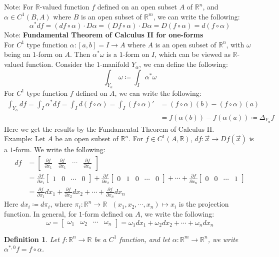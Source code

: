 \documentclass[15pt]{book}
\theoremstyle{break}
\theoremstyle{break}
\newtheorem{defn}{Definition}[corL]
\newcommand{\R}{\mathbb{R}}
\newcommand{\bmat}[1]{\begin{bmatrix} #1 \end{bmatrix}}
\newcommand{\note}{\color{red}Note: \color{black}}
\newcommand{\example}{\color{green}Example: \color{black}}
\begin{document}
\note For $\R$-valued function $f$ defined on an open subset $A$ of $\R^n$, and $\alpha\in C^1(B,A)$ where $B$ is an open subset of $\R^m$, we can write the following: 
$$\alpha^*df = (df\circ \alpha)\cdot D\alpha =(Df\circ \alpha)\cdot D\alpha = D(f\circ \alpha) = d(f\circ \alpha)$$ 
\note \textbf{Fundamental Theorem of Calculus II for one-forms}\\
For $C^1$ type function $\alpha:[a,b]=I \to A$ where $A$ is an open subset of $\R^n$, with $\omega$ being an $1$-form on $A$. Then $\alpha^*\omega$ is a $1$-form on $I$, which can be viewed as $\R$-valued function. Consider the $1$-manifold $Y_\alpha$, we can define the following:
$$\int_{Y_\alpha} \omega \coloneqq \int_I \alpha^*\omega$$
For $C^1$ type function $f$ defined on $A$, we can write the following: 
\begin{align*}
\int_{Y_\alpha} df = \int_I \alpha^*df = \int_I d(f\circ \alpha) = \int_I (f\circ \alpha)' 
&= (f\circ \alpha)(b) - (f\circ \alpha) (a) \\
&= f(\alpha(b)) - f(\alpha(a))\coloneqq \Delta_{Y_\alpha}f
\end{align*}
Here we get the results by the Fundamental Theorem of Calculus II. \\


\example Let $A$ be an open subset of $\R^n$. For $f\in C^1(A,\R)$, $df:\vec{x} \to Df(\vec{x})$ is a $1$-form. We write the following:
\begin{align*}
df &= \bmat{\frac{\partial f}{\partial x_1}&\frac{\partial f}{\partial x_1} &\cdots& \frac{\partial f}{\partial x_n}}\\ &= \frac{\partial f}{\partial x_1}\bmat{1&0&\cdots&0} + \frac{\partial f}{\partial x_2}\bmat{0&1&0&\cdots&0} + \cdots + \frac{\partial f}{\partial x_n}\bmat{0&0&\cdots&1} \\&= \frac{\partial f}{\partial x_1} dx_1 + \frac{\partial f}{\partial x_2 }dx_2 + \cdots + \frac{\partial f}{\partial x_n}dx_n
\end{align*}
Here $dx_i \coloneqq d\pi_i$, where $\pi_i : \R^n \to \R \ \ \ (x_1,x_2,\cdots, x_n)\mapsto x_i$ is the projection function.
In general, for $1$-form defined on $A$, we write the following: 
$$\omega = \bmat{\omega_1 &\omega_2 &\cdots &\omega_n} = \omega_1 dx_1 +\omega_2 dx_2 + \cdots + \omega_n dx_n$$

\begin{defn}
Let $f:\R^n \to \R$ be a $C^1$ function, and let $\alpha:\R^m \to \R^n$, we write $\alpha^{*,0}f = f\circ \alpha$.
\end{defn}
\end{document}
